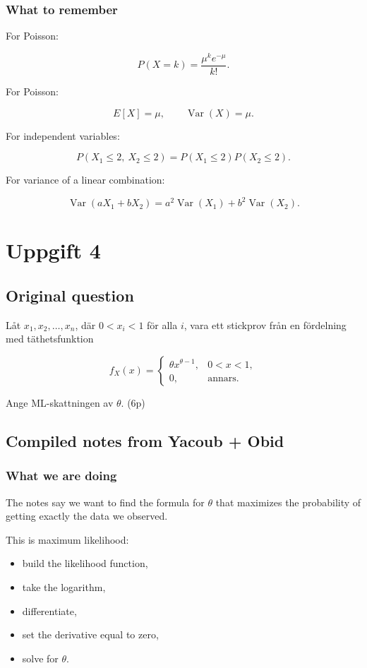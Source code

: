\documentclass[10pt]{article}
\begin{document}
\subsubsection*{What to remember}
For Poisson:

\[
P(X=k)=
\frac{\mu^k e^{-\mu}}{k!}.
\]

For Poisson:

\[
E[X]=\mu,
\qquad
\operatorname{Var}(X)=\mu.
\]

For independent variables:

\[
P(X_1\leq 2,\ X_2\leq 2)
=
P(X_1\leq 2)P(X_2\leq 2).
\]

For variance of a linear combination:

\[
\operatorname{Var}(aX_1+bX_2)
=
a^2\operatorname{Var}(X_1)
+b^2\operatorname{Var}(X_2).
\]

\section*{Uppgift 4}

\subsection*{Original question}
Låt $x_1,x_2,\ldots,x_n$, där $0<x_i<1$ för alla $i$, vara ett
stickprov från en fördelning med täthetsfunktion

\[
f_X(x)=
\begin{cases}
\theta x^{\theta-1},
& 0<x<1,\\
0,
& \text{annars.}
\end{cases}
\]

Ange ML-skattningen av $\theta$.
\hfill (6p)

\subsection*{Compiled notes from Yacoub + Obid}

\subsubsection*{What we are doing}
The notes say we want to find the formula for $\theta$ that maximizes
the probability of getting exactly the data we observed.

This is maximum likelihood:

\begin{itemize}
\item build the likelihood function,
\item take the logarithm,
\item differentiate,
\item set the derivative equal to zero,
\item solve for $\theta$.
\end{itemize}
\end{document}
